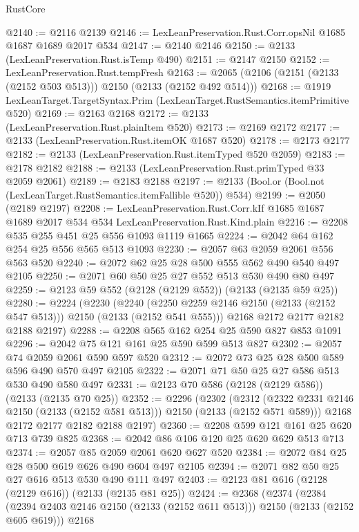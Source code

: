\begin{lexlean}{RustCore}
\begin{coremodule}
@2140 := @2116 @2139
@2146 := LexLeanPreservation.Rust.Corr.opsNil @1685 @1687 @1689 @2017 @534
@2147 := @2140 @2146
@2150 := @2133 (LexLeanPreservation.Rust.isTemp @490)
@2151 := @2147 @2150
@2152 := LexLeanPreservation.Rust.tempFresh
@2163 := @2065 (@2106 (@2151 (@2133 (@2152 @503 @513))) @2150 (@2133 (@2152 @492 @514)))
@2168 := @1919 LexLeanTarget.TargetSyntax.Prim (LexLeanTarget.RustSemantics.itemPrimitive @520)
@2169 := @2163 @2168
@2172 := @2133 (LexLeanPreservation.Rust.plainItem @520)
@2173 := @2169 @2172
@2177 := @2133 (LexLeanPreservation.Rust.itemOK @1687 @520)
@2178 := @2173 @2177
@2182 := @2133 (LexLeanPreservation.Rust.itemTyped @520 @2059)
@2183 := @2178 @2182
@2188 := @2133 (LexLeanPreservation.Rust.primTyped @33 @2059 @2061)
@2189 := @2183 @2188
@2197 := @2133 (Bool.or (Bool.not (LexLeanTarget.RustSemantics.itemFallible @520)) @534)
@2199 := @2050 (@2189 @2197)
@2208 := LexLeanPreservation.Rust.Corr.kIf
    @1685
    @1687
    @1689
    @2017
    @534
    @534
    LexLeanPreservation.Rust.Kind.plain
@2216 := @2208 @535 @255 @451 @25 @556 @1093 @1119 @1665
@2224 := @2042 @64 @162 @254 @25 @556 @565 @513 @1093
@2230 := @2057 @63 @2059 @2061 @556 @563 @520
@2240 := @2072 @62 @25 @28 @500 @555 @562 @490 @540 @497 @2105
@2250 := @2071 @60 @50 @25 @27 @552 @513 @530 @490 @80 @497
@2259 := @2123 @59 @552 (@2128 (@2129 @552)) (@2133 (@2135 @59 @25))
@2280 := @2224
    (@2230
      (@2240 (@2250 @2259 @2146 @2150 (@2133 (@2152 @547 @513))) @2150 (@2133 (@2152 @541 @555)))
      @2168
      @2172
      @2177
      @2182
      @2188
      @2197)
@2288 := @2208 @565 @162 @254 @25 @590 @827 @853 @1091
@2296 := @2042 @75 @121 @161 @25 @590 @599 @513 @827
@2302 := @2057 @74 @2059 @2061 @590 @597 @520
@2312 := @2072 @73 @25 @28 @500 @589 @596 @490 @570 @497 @2105
@2322 := @2071 @71 @50 @25 @27 @586 @513 @530 @490 @580 @497
@2331 := @2123 @70 @586 (@2128 (@2129 @586)) (@2133 (@2135 @70 @25))
@2352 := @2296
    (@2302
      (@2312 (@2322 @2331 @2146 @2150 (@2133 (@2152 @581 @513))) @2150 (@2133 (@2152 @571 @589)))
      @2168
      @2172
      @2177
      @2182
      @2188
      @2197)
@2360 := @2208 @599 @121 @161 @25 @620 @713 @739 @825
@2368 := @2042 @86 @106 @120 @25 @620 @629 @513 @713
@2374 := @2057 @85 @2059 @2061 @620 @627 @520
@2384 := @2072 @84 @25 @28 @500 @619 @626 @490 @604 @497 @2105
@2394 := @2071 @82 @50 @25 @27 @616 @513 @530 @490 @111 @497
@2403 := @2123 @81 @616 (@2128 (@2129 @616)) (@2133 (@2135 @81 @25))
@2424 := @2368
    (@2374
      (@2384 (@2394 @2403 @2146 @2150 (@2133 (@2152 @611 @513))) @2150 (@2133 (@2152 @605 @619)))
      @2168

\end{coremodule}
\end{lexlean}
